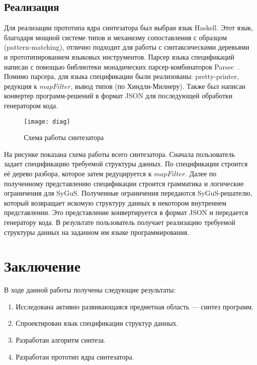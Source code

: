 \documentclass[14pt]{matmex-diploma-custom}
\begin{document}
\subsection{Реализация}
Для реализации прототипа ядра синтезатора был выбран язык Haskell. Этот язык, благодаря мощной системе типов и механизму сопоставления с образцом (pattern-matching), отлично подходит для работы с синтаксическими деревьями и прототипированием языковых инструментов.
Парсер языка спецификаций написан с помощью библиотеки монадических парсер-комбинаторов Parsec~\cite{parsec2001}.
Помимо парсера, для языка спецификации были реализованы: pretty-printer, редукция к $mapFilter$, вывод типов (по Хиндли-Милнеру). Также был написан конвертер программ-решений в формат JSON для последующей обработки генератором кода.

\begin{figure}[h]
\caption{Схема работы синтезатора}
\centering
\texttt{[image: diag]}
\end{figure}

На рисунке показана схема работы всего синтезатора. Сначала пользователь задает спецификацию требуемой структуры данных. По спецификации строится её дерево разбора, которое затем редуцируется к $mapFilter$. Далее по полученному представлению спецификации строится грамматика и логические ограничения для SyGuS. Полученные ограничения передаются SyGuS-решателю, который возвращает искомую структуру данных в некотором внутреннем представлении. Это представление конвертируется в формат JSON и передается генератору кода. В результате пользователь получает реализацию требуемой структуры данных на заданном им языке программирования.

\section{Заключение}
В ходе данной работы получены следующие результаты:
\begin{enumerate}
    \item Исследована активно развивающаяся предметная область --- синтез программ.
    \item Спроектирован язык спецификации структур данных.
    \item Разработан алгоритм синтеза.
    \item Разработан прототип ядра синтезатора.
\end{enumerate}
\end{document}

